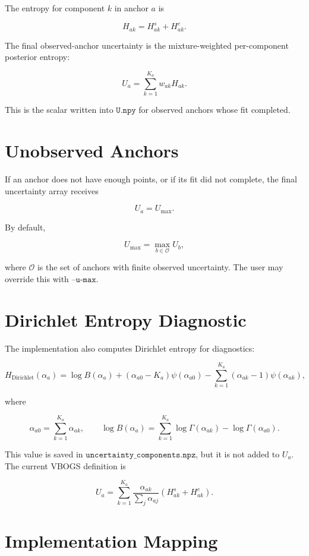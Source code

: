 \documentclass[11pt]{article}
\newcommand{\Dir}{\operatorname{Dirichlet}}
\begin{document}
The entropy for component \(k\) in anchor \(a\) is

\[
  H_{ak}
  =
  H^s_{ak}
  +
  H^c_{ak}.
\]

The final observed-anchor uncertainty is the mixture-weighted per-component
posterior entropy:

\[
  U_a
  =
  \sum_{k=1}^{K_a}
  w_{ak} H_{ak}.
\]

This is the scalar written into \(\texttt{U.npy}\) for observed anchors whose
fit completed.

\section{Unobserved Anchors}

If an anchor does not have enough points, or if its fit did not complete, the
final uncertainty array receives

\[
  U_a = U_{\max}.
\]

By default,

\[
  U_{\max}
  =
  \max_{b \in \mathcal{O}} U_b,
\]

where \(\mathcal{O}\) is the set of anchors with finite observed uncertainty.
The user may override this with \(\texttt{--u-max}\).

\section{Dirichlet Entropy Diagnostic}

The implementation also computes Dirichlet entropy for diagnostics:

\[
  H_{\Dir}(\alpha_a)
  =
  \log B(\alpha_a)
  +
  (\alpha_{a0} - K_a)\psi(\alpha_{a0})
  -
  \sum_{k=1}^{K_a}
  (\alpha_{ak} - 1)\psi(\alpha_{ak}),
\]

where

\[
  \alpha_{a0}
  =
  \sum_{k=1}^{K_a}
  \alpha_{ak},
  \qquad
  \log B(\alpha_a)
  =
  \sum_{k=1}^{K_a}\log\Gamma(\alpha_{ak})
  -
  \log\Gamma(\alpha_{a0}).
\]

This value is saved in \(\texttt{uncertainty\_components.npz}\), but it is not
added to \(U_a\). The current VBOGS definition is

\[
  \boxed{
    U_a
    =
    \sum_{k=1}^{K_a}
    \frac{\alpha_{ak}}
         {\sum_j \alpha_{aj}}
    \left(
      H^s_{ak} + H^c_{ak}
    \right)
  }.
\]

\section{Implementation Mapping}
\end{document}
